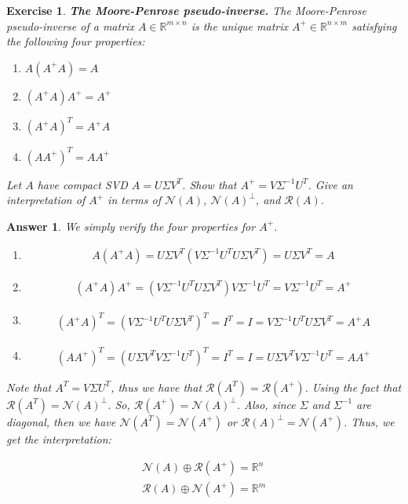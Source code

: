 \documentclass[12pt]{article}
\theoremstyle{colon}
\newtheorem{exercise}{Exercise}
\newtheorem*{answer}{Answer}
\begin{document}
\clearpage

\begin{exercise}
  \textbf{The Moore-Penrose pseudo-inverse.} The Moore-Penrose pseudo-inverse of a matrix $A \in \mathbb{R}^{m \times n}$ is the unique matrix $A^+ \in \mathbb{R}^{n \times m}$ satisfying the following four properties:

  \begin{enumerate}[label=\alph*)]
    \item $A(A^+ A) = A$
    \item $(A^+ A)A^+ = A^+$
    \item $(A^+ A)^T = A^+ A$
    \item $(A A^+)^T = A A^+$
  \end{enumerate}

  Let $A$ have compact SVD $A = U \Sigma V^T$. Show that $A^+ = V \Sigma^{-1} U^T$. Give an interpretation of $A^+$ in terms of $\mathcal{N}(A)$, $\mathcal{N}(A)^\perp$, and $\mathcal{R}(A)$.
\end{exercise}

\begin{answer}
  We simply verify the four properties for $A^+$.

  \begin{enumerate}[label=\alph*)]
    \item
      \begin{gather*}
        A(A^+ A) = U \Sigma V^T (V \Sigma^{-1} U^T U \Sigma V^T) = U \Sigma V^T = A
      \end{gather*}
    \item
      \begin{gather*}
        (A^+ A)A^+ = (V \Sigma^{-1} U^T U \Sigma V^T) V \Sigma^{-1} U^T = V \Sigma^{-1} U^T = A^+
      \end{gather*}
    \item
      \begin{gather*}
        (A^+ A)^T = (V \Sigma^{-1} U^T U \Sigma V^T)^T = I^T = I = V \Sigma^{-1} U^T U \Sigma V^T = A^+ A
      \end{gather*}
    \item
      \begin{gather*}
        (A A^+)^T = (U \Sigma V^T V \Sigma^{-1} U^T)^T = I^T = I = U \Sigma V^T V \Sigma^{-1} U^T = A A^+
      \end{gather*}
  \end{enumerate}

  Note that $A^T = V \Sigma U^T$, thus we have that $\mathcal{R}(A^T) = \mathcal{R}(A^+)$. Using the fact that $\mathcal{R}(A^T) = \mathcal{N}(A)^\perp$. So, $\mathcal{R}(A^+) = \mathcal{N}(A)^\perp$. Also, since $\Sigma$ and $\Sigma^{-1}$ are diagonal, then we have $\mathcal{N}(A^T) = \mathcal{N}(A^+)$ or $\mathcal{R}(A)^\perp = \mathcal{N}(A^+)$. Thus, we get the interpretation:

  \begin{gather*}
    \mathcal{N}(A) \oplus \mathcal{R}(A^+) = \mathbb{R}^n \\
    \mathcal{R}(A) \oplus \mathcal{N}(A^+) = \mathbb{R}^m
  \end{gather*}
\end{answer}
\end{document}
